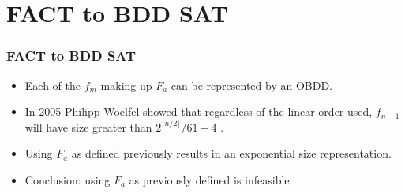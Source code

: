 \documentclass{beamer}
\begin{document}
\begin{frame}
\begin{example}[Construction]
\end{example}
\end{frame}



\section[Fact to BDD SAT]{FACT to BDD SAT}
\begin{frame}
\frametitle{FACT to BDD SAT}
\begin{itemize}
\item Each of the $f_m$ making up $F_a$ can be represented by an OBDD.
\item In 2005 Philipp Woelfel showed that regardless of the linear order used, $f_{n-1}$ will have size greater than $2^{\lfloor n/2 \rfloor}/61-4$ \cite{Woel/2005}.
\item Using $F_a$ as defined previously results in an exponential size representation.
\item Conclusion: using $F_a$ as previously defined is infeasible.
\end{itemize}
\end{frame}
\end{document}
